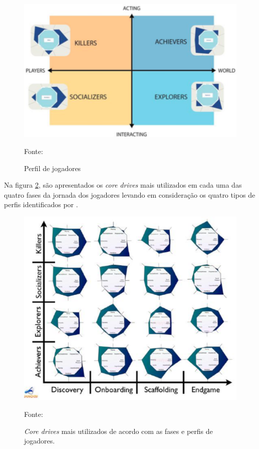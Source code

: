 \begin{figure}[h]
	\centering
	\includegraphics[keepaspectratio=true,scale=0.6]{figuras/perfiljogadores.png}
	\caption{Perfil de jogadores}
	Fonte: \cite{chou2017actionable}
	\label{perfiljogadores}
\end{figure}
 
Na figura \ref{nivel3}, são apresentados os \textit{core drives} mais utilizados em cada uma das quatro fases da jornada dos jogadores levando em
consideração os quatro tipos de perfis identificados por .

\begin{figure}[h]
	\centering
	\includegraphics[keepaspectratio=true,scale=0.5]{figuras/nivel3.png}
	\caption{\textit{Core drives} mais utilizados de acordo com as fases e perfis de jogadores.}
	Fonte: \cite{chou2017actionable}
	\label{nivel3}
\end{figure}

